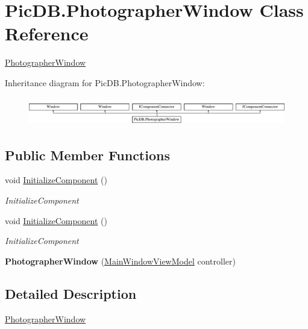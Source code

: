\hypertarget{class_pic_d_b_1_1_photographer_window}{}\section{Pic\+D\+B.\+Photographer\+Window Class Reference}
\label{class_pic_d_b_1_1_photographer_window}


\mbox{\hyperlink{class_pic_d_b_1_1_photographer_window}{Photographer\+Window}}  


Inheritance diagram for Pic\+D\+B.\+Photographer\+Window\+:\begin{figure}[H]
\begin{center}
\leavevmode
\includegraphics[height=1.244444cm]{class_pic_d_b_1_1_photographer_window}
\end{center}
\end{figure}
\subsection*{Public Member Functions}
\begin{DoxyCompactItemize}
\item 
void \mbox{\hyperlink{class_pic_d_b_1_1_photographer_window_a528826a00b921b4d9c56dc8d5f387090}{Initialize\+Component}} ()
\begin{DoxyCompactList}\small\item\em Initialize\+Component \end{DoxyCompactList}\item 
void \mbox{\hyperlink{class_pic_d_b_1_1_photographer_window_a528826a00b921b4d9c56dc8d5f387090}{Initialize\+Component}} ()
\begin{DoxyCompactList}\small\item\em Initialize\+Component \end{DoxyCompactList}\item 
\mbox{\label{class_pic_d_b_1_1_photographer_window_a82833f91b34b9847f66119ca6ca389f8}} 
{\bfseries Photographer\+Window} (\mbox{\hyperlink{class_pic_d_b_1_1_view_models_1_1_main_window_view_model}{Main\+Window\+View\+Model}} controller)
\end{DoxyCompactItemize}


\subsection{Detailed Description}
\mbox{\hyperlink{class_pic_d_b_1_1_photographer_window}{Photographer\+Window}} 

